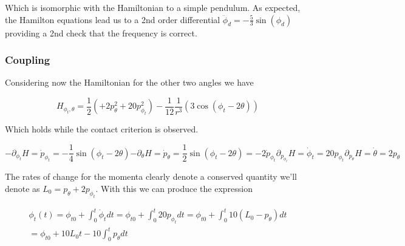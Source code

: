 \documentclass[prb,preprint]{revtex4-1}
\begin{document}
Which is isomorphic with the Hamiltonian to a simple pendulum. As expected, the Hamilton equations lead us to  a 2nd order differential $\ddot \phi_d = - \frac{5}{3}\sin(\phi_d)$ providing a 2nd check that the frequency is correct.

\subsubsection{Coupling}

Considering now the Hamiltonian for the other two angles we have

\begin{equation}
	H_{\phi_t, \theta}=
	\frac{1}{2}\left (
	+2 p_\theta^2
	+20 p_{\phi_t}^2 
        \right )
	-
	\frac{1}{12}
	\frac{1}{r^3}(
	        3\cos(\phi_t-2\theta)
	    )
\end{equation}

Which holds while the contact criterion is observed.

\begin{subequations}
	\begin{equation}\label{f_phit}
		-\partial_{\phi_t}H= \dot p_{\phi_t} 
		= - \frac{1}{4} \sin{\left (\phi_{t} - 2 \theta \right )}
	\end{equation}
	\begin{equation}\label{f_tht}
		-\partial_{\theta}H= \dot p_{\theta}  
		= \frac{1}{2} \sin{\left (\phi_{t} - 2 \theta \right )}
		=-2\dot p_{\phi_t}
	\end{equation}
	\begin{equation}
		\partial_{p_{\phi_t}}H= \dot \phi_t 
		= 20 p_{\phi_t}
	\end{equation}
	\begin{equation}
		\partial_{p_{\theta}}H= \dot \theta 
		= 2 p_{\theta}
	\end{equation}
\end{subequations}

The rates of change for the momenta clearly denote a conserved quantity we'll denote as $L_0 = p_\theta + 2p_{\phi_t}$. With this we can produce the expression

\begin{equation}
  \begin{multlined}
	\phi_t(t) 
	= \phi_{t0} + \int_0^t  \dot \phi_t  dt
	= \phi_{t0} + \int_0^t  20 p_{ \phi_t } dt
	= \phi_{t0} + \int_0^t  10 (L_0-p_{ \theta }) dt
	\\
	= \phi_{t0} + 10L_0t -10 \int_0^t  p_{ \theta } dt
  \end{multlined}
\end{equation}
\end{document}
